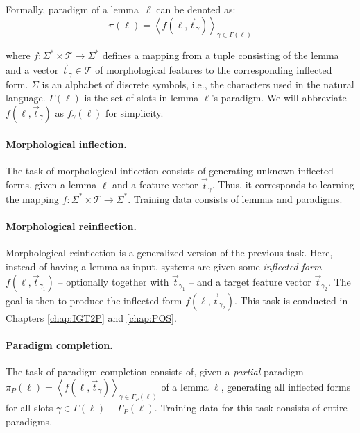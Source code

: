 Formally, paradigm of a lemma~$\ell$ can be denoted as:
\begin{equation}
    \pi(\ell) = \left\langle f(\ell, \vec{t}_\gamma)\right\rangle_{\gamma \in \Gamma(\ell)}
\end{equation}

\noindent where $f : \Sigma^* \times \mathcal{T} \to \Sigma^*$ defines a mapping from a tuple consisting of the lemma and a vector $\vec{t}_\gamma \in \mathcal{T}$ of morphological features to the corresponding inflected form. $\Sigma$ is an alphabet of discrete symbols, i.e., the characters used in the natural language. $\Gamma(\ell)$ is the set of slots in lemma $\ell$'s paradigm. 
We will abbreviate $f(\ell, \vec{t}_\gamma)$ as $f_{\gamma}(\ell)$ for simplicity.


\paragraph{Morphological inflection.}
The task of morphological inflection consists of generating unknown inflected forms, given a lemma 
$\ell$ and a feature vector $\vec{t}_\gamma$. Thus, it corresponds to learning the mapping $f : \Sigma^* \times \mathcal{T} \to \Sigma^*$. Training data consists of lemmas and paradigms.


\paragraph{Morphological reinflection. }
Morphological \textit{re}inflection is a generalized version of the previous task. Here, instead of having a lemma as input, systems are given some \textit{inflected form}  
$f(\ell, \vec{t}_{\gamma_1})$ -- optionally together with $\vec{t}_{\gamma_1}$ -- and a target feature vector $\vec{t}_{\gamma_2}$. The goal is then to produce the inflected form $f(\ell, \vec{t}_{\gamma_2})$. This task is conducted in Chapters \ref{chap:IGT2P} and \ref{chap:POS}.


\paragraph{Paradigm completion. }
The task of paradigm completion consists of, given a \textit{partial} paradigm $\pi_P(\ell) = \left\langle f(\ell, \vec{t}_\gamma)\right\rangle_{\gamma \in \Gamma_P(\ell)}$ of a lemma $\ell$, generating all inflected forms for all slots $\gamma \in \Gamma(\ell) - \Gamma_P(\ell)$.
Training data for this task consists of entire paradigms.

